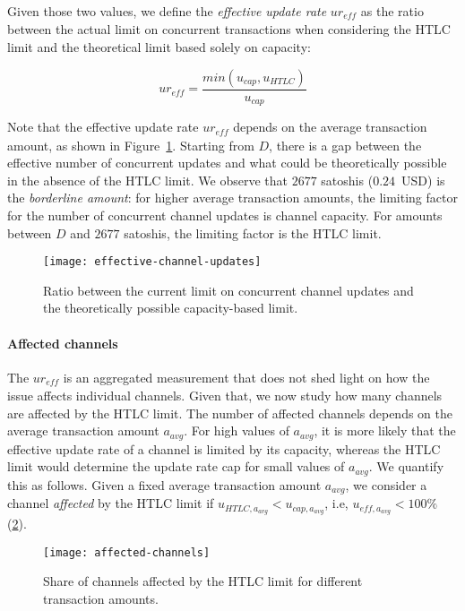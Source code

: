 Given those two values, we define the 
\textit{effective update rate} $ur_\textit{eff}$ as the ratio between the actual limit on concurrent 
transactions when considering the HTLC limit and the theoretical 
limit based solely on capacity:

\[ur_\textit{eff} = \frac{min(u_\textit{cap}, u_\textit{HTLC})}{u_\textit{cap}}\]

Note that the effective update rate $ur_\textit{eff}$ depends on 
the average transaction amount, as shown in Figure~\ref{fig:effective-channel-updates}.
Starting from $D$, there is a gap between the effective number of concurrent updates and what could be theoretically possible in the absence of the HTLC limit.
We observe that $2677$ satoshis ($0.24$~USD) is the \textit{borderline amount}: for higher average transaction amounts, 
the limiting factor for the number of concurrent channel updates is channel capacity.
For amounts between $D$ and $2677$ satoshis, the limiting factor is the HTLC limit.

\begin{figure}[tb]
	\centering
	\texttt{[image: effective-channel-updates]}
	\caption{Ratio between the current limit on concurrent channel updates and the theoretically possible 
		capacity-based limit.\label{fig:effective-channel-updates}}
\end{figure}

\paragraph{Affected channels}
The $ur_\textit{eff}$ is an aggregated measurement that does not shed 
light on how the issue affects individual channels.  
Given that, we now study how many channels are affected by the HTLC limit.
The number of affected channels depends on the average transaction amount $a_\textit{avg}$. 
For high values of $a_\textit{avg}$, it is more likely that 
the effective update rate of a channel is limited by its capacity, 
whereas the HTLC limit would determine the update rate cap for small values of $a_\textit{avg}$.
We quantify this as follows.
Given a fixed average transaction amount $a_\textit{avg}$, 
we consider a channel \textit{affected} by the HTLC limit if $u_{\textit{HTLC},a_\textit{avg}} < u_{\textit{cap},a_\textit{avg}}$, i.e, $u_{\textit{eff},a_\textit{avg}} < 100\%$ (\cref{fig:affected-channels}).

\begin{figure}[tb]
	\centering
	\texttt{[image: affected-channels]}
	\caption{Share of channels affected by the HTLC limit for different transaction amounts. \label{fig:affected-channels}}
\end{figure}




